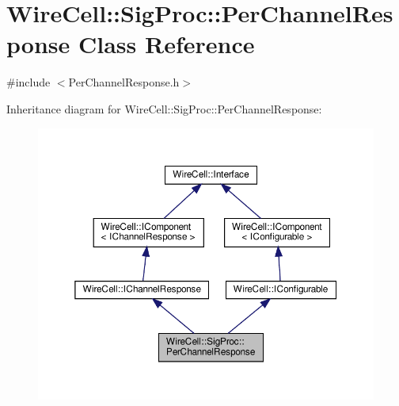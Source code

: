 \hypertarget{class_wire_cell_1_1_sig_proc_1_1_per_channel_response}{}\section{Wire\+Cell\+:\+:Sig\+Proc\+:\+:Per\+Channel\+Response Class Reference}
\label{class_wire_cell_1_1_sig_proc_1_1_per_channel_response}


{\ttfamily \#include $<$Per\+Channel\+Response.\+h$>$}



Inheritance diagram for Wire\+Cell\+:\+:Sig\+Proc\+:\+:Per\+Channel\+Response\+:
\nopagebreak
\begin{figure}[H]
\begin{center}
\leavevmode
\includegraphics[width=350pt]{class_wire_cell_1_1_sig_proc_1_1_per_channel_response__inherit__graph}
\end{center}
\end{figure}


